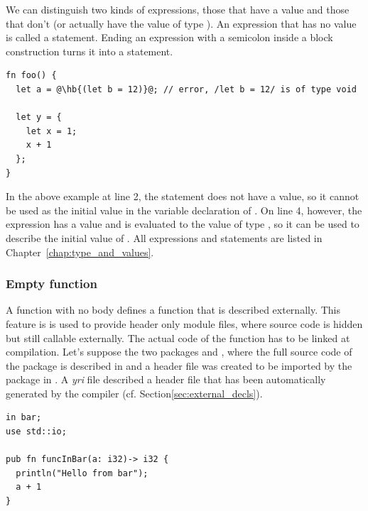 We can distinguish two kinds of expressions, those that have a value and those
that don't (or actually have the value  of type ). An
expression that has no value is called a statement. Ending an expression with a
semicolon inside a block construction turns it into a statement.

\begin{lstlisting}[style=coloredverbatimError, escapechar=@]
fn foo() {
  let a = @\hb{(let b = 12)}@; // error, /let b = 12/ is of type void

  let y = {
    let x = 1;
    x + 1
  };
}
\end{lstlisting}

In the above example at line 2, the statement  does not have
a value, so it cannot be used as the initial value in the variable declaration
of . On line 4, however, the expression 
has a value and is evaluated to the value  of type , so it
can be used to describe the initial value of . All expressions and
statements are listed in Chapter~\ref{chap:type_and_values}.

\subsubsection*{Empty function}

A function with no body defines a function that is described externally. This
feature is is used to provide header only module files, where source code is
hidden but still callable externally. The actual code of the function has to be
linked at compilation. Let's suppose the two packages  and
, where the full source code of the package  is
described in  and a header file was created to be
imported by the package  in . A
\textit{yri} file described a header file that has been automatically generated
by the compiler (cf. Section\ref{sec:external_decls}).


\begin{lstlisting}[caption=\textit{./bar/src/bar.yr}, style=coloredverbatim]
in bar;
use std::io;

pub fn funcInBar(a: i32)-> i32 {
  println("Hello from bar");
  a + 1
}
\end{lstlisting}

